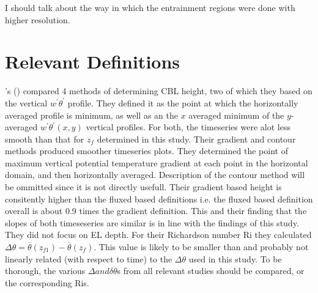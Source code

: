 I should talk about the way in which the entrainment regions were done with higher resolution.\\

\clearpage

\section{Relevant Definitions}

\FloatBarrier

\citeauthor{SullMoengStev}'s (\cite{SullMoengStev}) compared 4 methods of determining \acs{CBL} height, two of which they based on the vertical $w^{'}\theta^{'}$ profile.  They defined it as the point at which the horizontally averaged profile is minimum, as well as an the $x$ averaged minimum of the $y$-averaged $w^{'}\theta^{'}(x,y)$ vertical profiles.  For both, the timeseries were alot less smooth than that for $z_{f}$ determined in this study.  Their gradient and contour methods produced smoother timeseries plots.  They determined the point of maximum vertical potential temperature gradient at each point in the horizontal domain, and then horizontally averaged.  Description of the contour method will be ommitted since it is not directly usefull. Their gradient based height is consitently higher than the fluxed based definitions i.e. the fluxed based definition overall is about 0.9 times the gradient definition. This and their finding that the slopes of both timeseseries are similar is in line with the findings of this study. They did not focus on \acs{EL} depth. For their Richardson number \acs{Ri} they calculated $\Delta \theta = \overline{\theta}(z_{f1})-\overline{\theta}(z_{f})$.  This value is likely to be smaller than  and probably not linearly related (with respect to time) to the $\Delta \theta$ used in this study. To be thorough, the various $\Delta and \delta \theta$s from all relevant studies should be compared, or the corresponding \acs{Ri}s. \\

